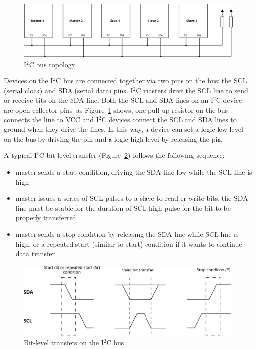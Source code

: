 \documentclass[a4paper,11pt]{article}
\begin{document}
\begin{figure}[h]
  \centerline{\includegraphics[width=\textwidth]{fig/i2c-bus}}
  \caption{I$^2$C bus topology}
  \label{fig:i2c-bus}
\end{figure}

Devices on the I$^2$C bus are connected together via two pins on the bus: the SCL 
(serial clock) and SDA (serial data) pins. I$^2$C masters drive the SCL line to send or
receive bits on the SDA line. Both the SCL and SDA lines on an I$^2$C device are open-collector
pins; as Figure~\ref{fig:i2c-bus} shows, one pull-up resistor on the bus connects the line to 
VCC and I$^2$C devices connect the SCL and SDA lines to ground when they drive the lines. 
In this way, a device can set a logic low level on the bus by driving the pin and a logic 
high level by releasing the pin.

A typical I$^2$C bit-level transfer (Figure~\ref{fig:i2c-bitlevel}) follows the following sequence:
\begin{itemize}
  \item master sends a start condition, driving the SDA line low while the SCL line is high
  \item master issues a series of SCL pulses to a slave to read or write bits;
  the SDA line must be stable for the duration of SCL high pulse for the bit to be properly
  transferred
  \item master sends a stop condition by releasing the SDA line while SCL line is high,
  or a repeated start (similar to start) condition if it wants to continue data transfer
\end{itemize}

\begin{figure}[h]
  \centerline{\includegraphics[width=\textwidth]{fig/i2c-bitlevel}}
  \caption{Bit-level transfers on the I$^2$C bus}
  \label{fig:i2c-bitlevel}
\end{figure}
\end{document}
